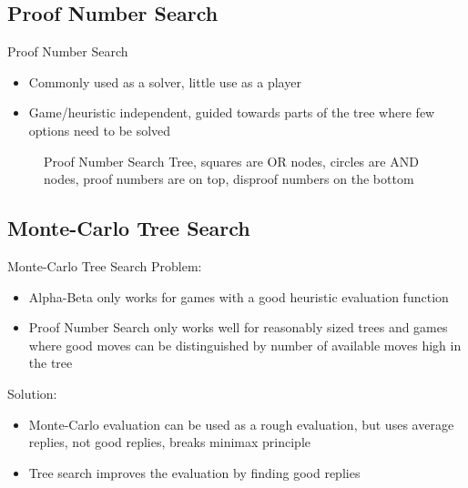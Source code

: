 \documentclass{beamer} %
\begin{document}
\subsection{Proof Number Search}

\begin{frame}{Proof Number Search}
\begin{itemize}
	\item Commonly used as a solver, little use as a player
	\item Game/heuristic independent, guided towards parts of the tree where few options need to be solved
\end{itemize}
\begin{figure}
\centering
{}
\caption{Proof Number Search Tree, squares are OR nodes, circles are AND nodes, proof numbers are on top, disproof numbers on the bottom}
\end{figure}
\end{frame}


\subsection{Monte-Carlo Tree Search}

\begin{frame}{Monte-Carlo Tree Search}
Problem:
\begin{itemize}
	\item Alpha-Beta only works for games with a good heuristic evaluation function
	\item Proof Number Search only works well for reasonably sized trees and games where good moves can be distinguished by number of available moves high in the tree
\end{itemize}
Solution:
\begin{itemize}
	\item Monte-Carlo evaluation can be used as a rough evaluation, but uses average replies, not good replies, breaks minimax principle
	\item Tree search improves the evaluation by finding good replies
\end{itemize}
\end{frame}
\end{document}
